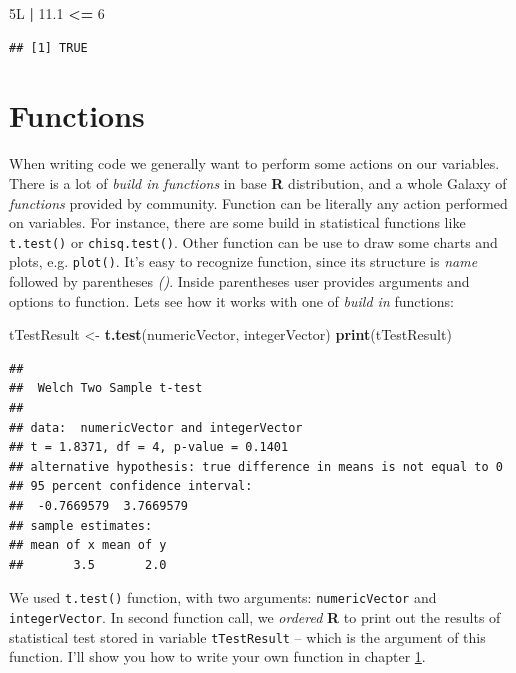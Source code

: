 \documentclass[]{book}
\newenvironment{Shaded}{\begin{snugshade}}{\end{snugshade}}
\newcommand{\KeywordTok}[1]{\textcolor[rgb]{0.13,0.29,0.53}{\textbf{#1}}}
\newcommand{\DecValTok}[1]{\textcolor[rgb]{0.00,0.00,0.81}{#1}}
\newcommand{\FloatTok}[1]{\textcolor[rgb]{0.00,0.00,0.81}{#1}}
\newcommand{\StringTok}[1]{\textcolor[rgb]{0.31,0.60,0.02}{#1}}
\newcommand{\OperatorTok}[1]{\textcolor[rgb]{0.81,0.36,0.00}{\textbf{#1}}}
\newcommand{\NormalTok}[1]{#1}
\theoremstyle{definition}
\theoremstyle{definition}
\theoremstyle{definition}
\theoremstyle{remark}
\begin{document}
\begin{Shaded}
\begin{Highlighting}[]
\NormalTok{5L }\OperatorTok{|}\StringTok{ }\FloatTok{11.1} \OperatorTok{<=}\StringTok{ }\DecValTok{6}
\end{Highlighting}
\end{Shaded}

\begin{verbatim}
## [1] TRUE
\end{verbatim}

\section{Functions}\label{functions}

When writing code we generally want to perform some actions on our
variables. There is a lot of \emph{build in functions} in base
\textbf{R} distribution, and a whole Galaxy of \emph{functions} provided
by community. Function can be literally any action performed on
variables. For instance, there are some build in statistical functions
like \texttt{t.test()} or \texttt{chisq.test()}. Other function can be
use to draw some charts and plots, e.g. \texttt{plot()}. It's easy to
recognize function, since its structure is \emph{name} followed by
parentheses \emph{()}. Inside parentheses user provides arguments and
options to function. Lets see how it works with one of \emph{build in}
functions:

\begin{Shaded}
\begin{Highlighting}[]
\NormalTok{tTestResult <-}\StringTok{ }\KeywordTok{t.test}\NormalTok{(numericVector, integerVector)}
\KeywordTok{print}\NormalTok{(tTestResult)}
\end{Highlighting}
\end{Shaded}

\begin{verbatim}
## 
##  Welch Two Sample t-test
## 
## data:  numericVector and integerVector
## t = 1.8371, df = 4, p-value = 0.1401
## alternative hypothesis: true difference in means is not equal to 0
## 95 percent confidence interval:
##  -0.7669579  3.7669579
## sample estimates:
## mean of x mean of y 
##       3.5       2.0
\end{verbatim}

We used \texttt{t.test()} function, with two arguments:
\texttt{numericVector} and \texttt{integerVector}. In second function
call, we \emph{ordered} \textbf{R} to print out the results of
statistical test stored in variable \texttt{tTestResult} -- which is the
argument of this function. I'll show you how to write your own function
in chapter \ref{functions}.
\end{document}
